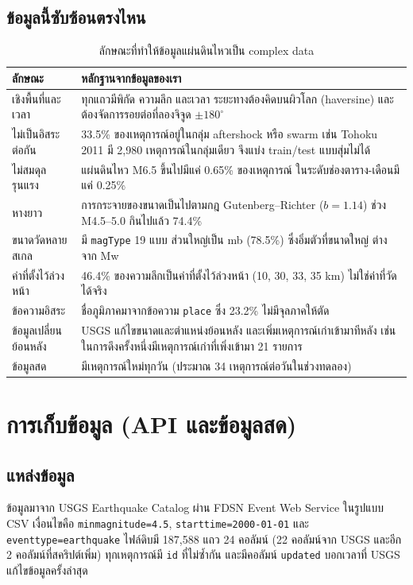 \documentclass[11pt,a4paper]{article}
\newcommand{\code}[1]{\texttt{#1}}
\begin{document}
\subsection{ข้อมูลนี้ซับซ้อนตรงไหน}

\begin{table}[H]
\centering\small
\begin{tabularx}{\textwidth}{@{}lX@{}}
\toprule
ลักษณะ & หลักฐานจากข้อมูลของเรา \\
\midrule
เชิงพื้นที่และเวลา & ทุกแถวมีพิกัด ความลึก และเวลา ระยะทางต้องคิดบนผิวโลก (haversine) และต้องจัดการรอยต่อที่ลองจิจูด $\pm180^\circ$ \\
ไม่เป็นอิสระต่อกัน & 33.5\% ของเหตุการณ์อยู่ในกลุ่ม aftershock หรือ swarm เช่น Tohoku 2011 มี 2{,}980 เหตุการณ์ในกลุ่มเดียว จึงแบ่ง train/test แบบสุ่มไม่ได้ \\
ไม่สมดุลรุนแรง & แผ่นดินไหว M6.5 ขึ้นไปมีแค่ 0.65\% ของเหตุการณ์ ในระดับช่องตาราง-เดือนมีแค่ 0.25\% \\
หางยาว & การกระจายของขนาดเป็นไปตามกฎ Gutenberg--Richter ($b = 1.14$) ช่วง M4.5--5.0 กินไปแล้ว 74.4\% \\
ขนาดวัดหลายสเกล & มี \code{magType} 19 แบบ ส่วนใหญ่เป็น mb (78.5\%) ซึ่งอิ่มตัวที่ขนาดใหญ่ ต่างจาก Mw \\
ค่าที่ตั้งไว้ล่วงหน้า & 46.4\% ของความลึกเป็นค่าที่ตั้งไว้ล่วงหน้า (10, 30, 33, 35 km) ไม่ใช่ค่าที่วัดได้จริง \\
ข้อความอิสระ & ชื่อภูมิภาคมาจากข้อความ \code{place} ซึ่ง 23.2\% ไม่มีจุลภาคให้ตัด \\
ข้อมูลเปลี่ยนย้อนหลัง & USGS แก้ไขขนาดและตำแหน่งย้อนหลัง และเพิ่มเหตุการณ์เก่าเข้ามาทีหลัง เช่น ในการดึงครั้งหนึ่งมีเหตุการณ์เก่าที่เพิ่งเข้ามา 21 รายการ \\
ข้อมูลสด & มีเหตุการณ์ใหม่ทุกวัน (ประมาณ 34 เหตุการณ์ต่อวันในช่วงทดลอง) \\
\bottomrule
\end{tabularx}
\caption{ลักษณะที่ทำให้ข้อมูลแผ่นดินไหวเป็น complex data}
\end{table}

\section{การเก็บข้อมูล (API และข้อมูลสด)}

\subsection{แหล่งข้อมูล}
ข้อมูลมาจาก USGS Earthquake Catalog ผ่าน FDSN Event Web Service \cite{usgs-api}
ในรูปแบบ CSV เงื่อนไขคือ \code{minmagnitude=4.5}, \code{starttime=2000-01-01} และ \code{eventtype=earthquake}
ไฟล์ดิบมี 187{,}588 แถว 24 คอลัมน์ (22 คอลัมน์จาก USGS และอีก 2 คอลัมน์ที่สคริปต์เพิ่ม) ทุกเหตุการณ์มี \code{id} ที่ไม่ซ้ำกัน และมีคอลัมน์ \code{updated}
บอกเวลาที่ USGS แก้ไขข้อมูลครั้งล่าสุด
\end{document}
